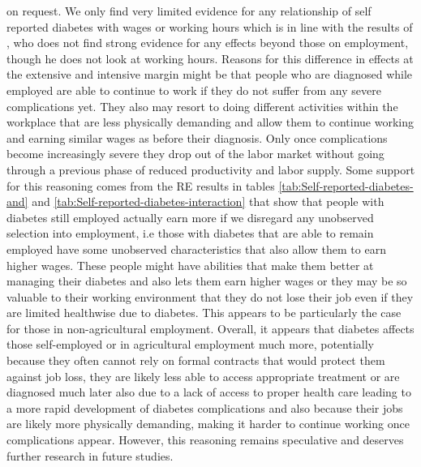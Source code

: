 \documentclass[12pt,english,british]{article}
\begin{document}
{on request.} We only find very limited evidence for any relationship of self reported diabetes with wages or working hours which is in line with the results of \citet{Minor2013}, who does not find strong evidence for any effects beyond those on employment, though he does not look at working hours. Reasons for this difference in effects at the extensive and intensive margin might be that people who are diagnosed while employed are able to continue to work if they do not suffer from any severe complications yet. They also may resort to doing different activities within the workplace that are less physically demanding and allow them to continue working and earning similar wages as before their diagnosis. Only once complications become increasingly severe they drop out of the labor market without going through a previous phase of reduced productivity and labor supply. Some support for this reasoning comes from the \ac{RE} results in tables \ref{tab:Self-reported-diabetes-and} and \ref{tab:Self-reported-diabetes-interaction} that show that people with diabetes still employed actually earn more if we disregard any unobserved selection into employment, i.e those with diabetes that are able to remain employed have some unobserved characteristics that also allow them to earn higher wages. These people might have abilities that make them better at managing their diabetes and also lets them earn higher wages or they may be so valuable to their working environment that they do not lose their job even if they are limited healthwise due to diabetes. This appears to be particularly the case for those in non-agricultural employment. Overall, it appears that diabetes affects those self-employed or in agricultural employment much more, potentially because they often cannot rely on formal contracts that would protect them against job loss, they are likely less able to access appropriate treatment or are diagnosed much later also due to a lack of access to proper health care leading to a more rapid development of diabetes complications and also because their jobs are likely more physically demanding, making it harder to continue working once complications appear. However, this reasoning remains speculative and deserves further research in future studies.
\end{document}
